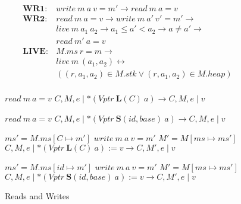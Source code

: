 \begin{figure}
  \scriptsize
  \begin{minipage}[t]{0.45\textwidth}
    \vspace{0em}
    \[\begin{aligned}
    \mathbf{WR1} : & \mathit{write} ~ m ~ a ~ v = m' \rightarrow \mathit{read} ~ m ~ a = v & \\[0.75em]
    \mathbf{WR2} : & \mathit{read} ~ m ~ a = v \rightarrow \mathit{write} ~ m ~ a' ~ v' = m' \rightarrow & \\
    & \mathit{live} ~ m ~ a_1 ~ a_2 \rightarrow a_1 \leq a' < a_2 \rightarrow a \not = a' \rightarrow & \\
    & \mathit{read} ~ m' ~ a = v & \\[0.75em]
    \mathbf{LIVE} : & M.ms ~ r = m \rightarrow & \\
    & \mathit{live} ~ m ~ (a_1,a_2) \leftrightarrow & \\
    & ((r,a_1,a_2) \in M.stk \lor (r,a_1,a_2) \in M.heap) & \\
    \end{aligned}\]
  \end{minipage}
  \begin{minipage}[t]{0.54\textwidth}
    \vspace{0em}
                {\(\mathit{read} ~ m ~ a = v\)}
                {\(C,M,e \mid *(\mathit{Vptr} ~ \mathbf{L}(C) ~ a)
                  \longrightarrow C,M,e \mid v\)}

                {\(\mathit{read} ~ m ~ a = v\)}
                {\(C,M,e \mid *(\mathit{Vptr} ~ \mathbf{S}(id, \mathit{base}) ~ a)
                  \longrightarrow C,M,e \mid v\)}

                  {\(ms' = M.ms[C\mapsto m']\)}
                  {\(\mathit{write} ~ m ~ a ~ v = m'\)}
                  {\(M' = M[ms \mapsto ms']\)}
                  {\(C,M,e \mid *(\mathit{Vptr} ~ \mathbf{L}(C) ~ a) := v
                    \longrightarrow C,M',e \mid v\)}

                  {\(ms' = M.ms[id \mapsto m']\)}
                  {\(\mathit{write} ~ m ~ a ~ v = m'\)}
                  {\(M' = M[ms \mapsto ms']\)}
                  {\(C,M,e \mid *(\mathit{Vptr} ~ \mathbf{S}(id, \mathit{base}) ~ a) := v
                    \longrightarrow C,M',e \mid v\)}
  \end{minipage}

  \caption{Reads and Writes}
  \label{ch5:subfig:rwstep}
\end{figure}

